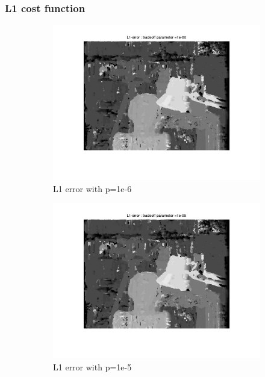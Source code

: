 \documentclass[fleqn]{article}
\begin{document}
\subsubsection{L1 cost function}
\begin{figure}[!ht]
 \begin{subfigure}{0.5\textwidth}
 \centering
\includegraphics[scale=0.2]{./pics/tsukuba_L1_error_p=1e-06.jpg}
\caption{L1 error with p=1e-6}
\end{subfigure}
 \begin{subfigure}{0.5\textwidth}
\includegraphics[scale=0.2]{./pics/tsukuba_L1_error_p=1e-05.jpg}
\caption{L1 error with p=1e-5}
\end{subfigure}
 \begin{subfigure}{0.5\textwidth}

\end{subfigure}
\end{figure}
\end{document}
